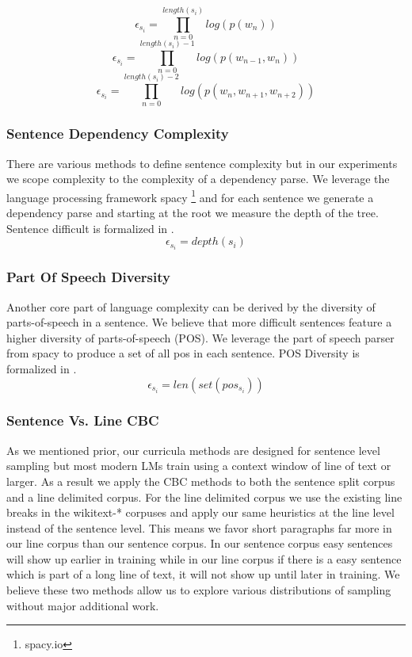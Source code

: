 \begin{equation}
  \epsilon_{s_i}= \prod_{n=0}^{length(s_i)} log(p(w_n))
\label{equation:unigramdifficulty}
\end{equation}
\begin{equation}
       \epsilon_{s_i} = \prod_{n=0}^{length(s_i)-1} log(p(w_{n-1}, w_n))
\label{equation:bigramdifficulty}
\end{equation}
\begin{equation}
    \epsilon_{s_i} = \prod_{n=0}^{length(s_i)-2} log(p(w_{n}, w_{n+1}, w_{n+2}))
\label{equation:trigramdifficulty}
\end{equation}
\subsubsection{Sentence Dependency Complexity}
There are various methods to define sentence complexity but in our experiments we scope complexity to the complexity of a dependency parse. We leverage the language processing framework spacy \footnote{spacy.io} and for each sentence we generate a dependency parse and starting at the root we measure the depth of the tree. Sentence difficult is formalized in .
\begin{equation}
    \epsilon_{s_i} = depth(s_i)
    \label{equation:dep}
\end{equation}
\subsubsection{Part Of Speech Diversity}
Another core part of language complexity can be derived by the diversity of parts-of-speech in a sentence. We believe that more difficult sentences feature a higher diversity of parts-of-speech (POS). We leverage the part of speech parser from spacy to produce a set of all pos in each sentence. POS Diversity is formalized in .
\begin{equation}
    \epsilon_{s_i} = len(set(pos_{s_i}))
    \label{equation:pos}
\end{equation}
\subsubsection{Sentence Vs. Line CBC}
As we mentioned prior, our curricula methods are designed for sentence level sampling but most modern LMs train using a context window of line of text or larger. As a result we apply the CBC methods to both the sentence split corpus and a line delimited corpus. For the line delimited corpus we use the existing line breaks in the wikitext-* corpuses and apply our same heuristics at the line level instead of the sentence level. This means we favor short paragraphs far more in our line corpus than our sentence corpus. In our sentence corpus easy sentences will show up earlier in training while in our line corpus if there is a easy sentence which is part of a long line of text, it will not show up until later in training. We believe these two methods allow us to explore various distributions of sampling without major additional work. 
